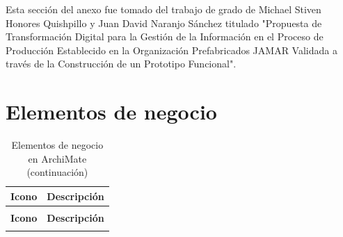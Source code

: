 \noindent
Esta sección del anexo fue tomado del trabajo de grado de Michael Stiven Honores Quishpillo y Juan David Naranjo Sánchez titulado "Propuesta de Transformación Digital para la Gestión de la Información en el Proceso de Producción Establecido en la Organización Prefabricados JAMAR Validada a través de la Construcción de un Prototipo Funcional". 

\section{Elementos de negocio}

\begin{longtable}{|c|p{8cm}|}
\caption{Elementos de negocio en ArchiMate} \label{tab:elementos-negocio-archimate} \\
\hline
\textbf{Icono} & \textbf{Descripción} \\
\hline
\endfirsthead

\caption[]{Elementos de negocio en ArchiMate (continuación)} \\
\hline
\textbf{Icono} & \textbf{Descripción} \\
\hline
\endhead

\hline
\endfoot


\end{longtable}
